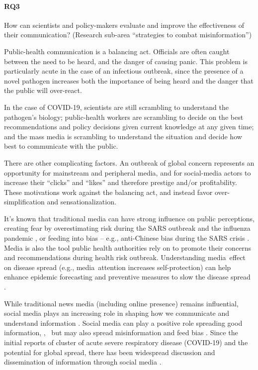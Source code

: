 \paragraph{RQ3} How can scientists and policy-makers evaluate and improve the effectiveness of their communication? (Research sub-area ``strategies to combat misinformation'')


Public-health communication is a balancing act. Officials are often caught between the need to be heard, and the danger of causing panic. This problem is particularly acute in the case of an infectious outbreak, since the presence of a novel pathogen increases both the importance of being heard and the danger that the public will over-react. 

In the case of COVID-19, scientists are still scrambling to understand the pathogen's biology; public-health workers are scrambling to decide on the best recommendations and policy decisions given current knowledge at any given time; and the mass media is scrambling to understand the situation and decide how best to communicate with the public. 

There are other complicating factors. An outbreak of global concern represents an opportunity for mainstream and peripheral media, and for social-media actors to increase their ``clicks'' and ``likes'' and therefore prestige and/or profitability. These motivations work against the balancing act, and instead favor over-simplification and sensationalization.

It's known that traditional media can have strong influence on public perceptions, creating fear by overestimating risk during the SARS outbreak \citep{BerrWhar07} and the influenza pandemic \citep{TchuDube11}, or feeding into bias -- e.g., anti-Chinese bias during the SARS crisis \citep{HuanLeun06}.  Media is also the tool public health authorities rely on to promote their concerns and recommendations during health risk outbreak.  Understanding media effect on disease spread (e.g., media attention increases self-protection) can help enhance epidemic forecasting and preventive measures to slow the disease spread \citep{KimFast19}.  

While traditional news media (including online presence) remains influential,  social media plays an increasing role in shaping how we communicate and understand information \citep{LiuSieg19}. Social media can play a positive role spreading good information, \cite{BascHill20, SunYang20,AhmeQuin18},  but may also spread misinformation and feed bias \citep{ChouOhA18, McKevanS19}.  Since the initial reports of cluster of acute severe respiratory disease (COVID-19) and the potential for global spread, there has been widespread discussion and dissemination of information through social media \citep{?}.

